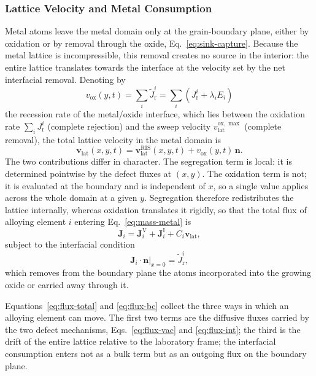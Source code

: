 \documentclass[3p,times]{elsarticle} %
\newcommand{\Vac}{\mathrm{V}}          %
\newcommand{\Int}{\mathrm{I}}          %
\newcommand{\lat}{\mathrm{lat}}
\newcommand{\ox}{\mathrm{ox}}
\begin{document}
\subsubsection{Lattice Velocity and Metal Consumption}
\label{sec:methodLattice}
Metal atoms leave the metal domain only at the grain-boundary plane, either by
oxidation or by removal through the oxide, Eq.~\eqref{eq:sink-capture}. Because
the metal lattice is incompressible, this removal creates no source in the
interior: the entire lattice translates towards the interface at the velocity set
by the net interfacial removal. Denoting by
\begin{equation}
v_{\ox}(y,t)=\sum_i \tilde{J}_{\mathrm{r}}^{i}
 =\sum_i\left(J_{\mathrm{r}}^{i}+\lambda_i E_i\right)
\label{eq:vlat-ox}
\end{equation}
the recession rate of the metal/oxide interface, which lies between the
oxidation rate \(\sum_i J_{\mathrm{r}}^{i}\) (complete rejection) and the sweep
velocity \(v_{\lat}^{\ox,\max}\) (complete removal), the total lattice velocity in
the metal domain is
\begin{equation}
\mathbf{v}_{\lat}(x,y,t)
 =\mathbf{v}_{\lat}^{\mathrm{RIS}}(x,y,t)
  +v_{\ox}(y,t)\,\mathbf{n} .
\label{eq:vlat-total}
\end{equation}
The two contributions differ in character. The segregation term is local: it is
determined pointwise by the defect fluxes at \((x,y)\). The oxidation term is
not; it is evaluated at the boundary and is independent of \(x\), so a single
value applies across the whole domain at a given \(y\). Segregation therefore
redistributes the lattice internally, whereas oxidation translates it rigidly, so that the total flux of alloying element \(i\) entering
Eq.~\eqref{eq:mass-metal} is
\begin{equation}
\mathbf{J}_i
 = \mathbf{J}_i^{\Vac}+\mathbf{J}_i^{\Int}
  +C_i\mathbf{v}_{\lat} ,
\label{eq:flux-total}
\end{equation}
subject to the interfacial condition
\begin{equation}
\left.\mathbf{J}_i\!\cdot\!\mathbf{n}\right|_{x=0}
 = \tilde{J}_{\mathrm{r}}^{i} ,
\label{eq:flux-bc}
\end{equation}
which removes from the boundary plane the atoms incorporated into the growing
oxide or carried away through it.

Equations~\eqref{eq:flux-total} and \eqref{eq:flux-bc} collect the three ways in which
an alloying element can move. The first two terms are the diffusive fluxes carried by
the two defect mechanisms, Eqs.~\eqref{eq:flux-vac} and \eqref{eq:flux-int}; the third
is the drift of the entire lattice relative to the laboratory frame; the interfacial
consumption enters not as a bulk term but as an outgoing flux on the boundary plane.
\end{document}
